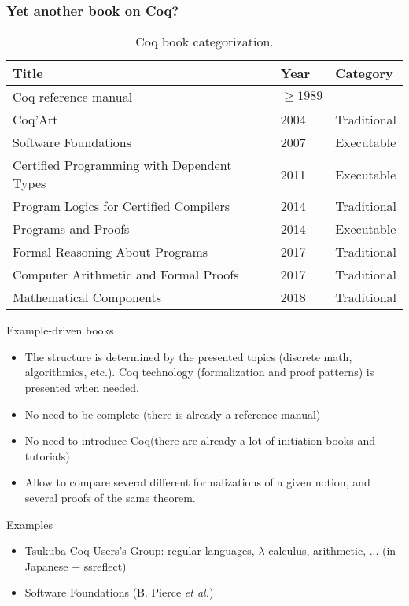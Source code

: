 \documentclass[10pt]{beamer}
\newcommand{\coq}{Coq\xspace}
\begin{document}
\begin{frame}
  \frametitle{Yet another book on \coq?}
  \begin{table}
  \centering
  \footnotesize
  \begin{tabular}{lll}
  \hline
  \textbf{Title} & \textbf{Year} & \textbf{Category}\\
    \hline
   \coq reference manual &  $\geq 1989$ & \\
  Coq'Art & 2004 & Traditional\\
  Software Foundations & 2007 & Executable\\
  Certified Programming with Dependent Types & 2011 &  Executable\\
  Program Logics for Certified Compilers & 2014 & Traditional\\
  Programs and Proofs & 2014 & Executable\\
  Formal Reasoning About Programs& 2017 & Traditional\\
  Computer Arithmetic and Formal Proofs & 2017 & Traditional\\
    Mathematical Components & 2018 & Traditional\\
  \hline
  \end{tabular}
  \caption{Coq book categorization.}
  \label{tbl:books}
\end{table}
  
\end{frame}


\begin{frame}
   \begin{block}{Example-driven books}
    \begin{itemize}
    \item The structure is determined by the presented topics (discrete math, algorithmics, etc.). \coq technology (formalization and proof patterns) is presented when needed.
    \item No need to be complete (there is already a reference manual)
    \item No need to introduce \coq (there are already a lot of initiation books and tutorials)
    \item Allow to compare several different formalizations of a given notion, and several proofs of the same theorem.
    \end{itemize}
  \end{block}
  \begin{block}{Examples}
    \begin{itemize}
    \item Tsukuba Coq Users's Group: regular languages, $\lambda$-calculus, arithmetic, ... (in Japanese + ssreflect)
    \item Software Foundations (B. Pierce \emph{et al.})
    \end{itemize}
  \end{block}
\end{frame}
\end{document}
